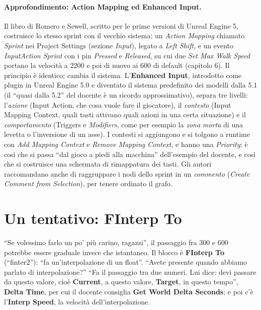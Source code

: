 \paragraph{Approfondimento: Action Mapping ed Enhanced Input.} Il libro di Romero e
Sewell, scritto per le prime versioni di Unreal Engine 5, costruisce lo stesso sprint
con il vecchio sistema: un \emph{Action Mapping} chiamato \emph{Sprint} nei Project
Settings (sezione \emph{Input}), legato a \emph{Left Shift}, e un evento
\emph{InputAction Sprint} con i pin \emph{Pressed} e \emph{Released}, su cui due
\emph{Set Max Walk Speed} portano la velocità a 2200 e poi di nuovo ai 600 di default
(capitolo 6). Il principio è identico; cambia il sistema. L'\textbf{Enhanced Input},
introdotto come plugin in Unreal Engine 5.0 e diventato il sistema predefinito dei
modelli dalla 5.1 (il ``quasi dalla 5.2'' del docente è un ricordo approssimativo), separa
tre livelli: l'\emph{azione} (Input Action, che cosa vuole fare il giocatore), il
\emph{contesto} (Input Mapping Context, quali tasti attivano quali azioni in una certa
situazione) e il \emph{comportamento} (Triggers e \emph{Modifiers}, come per esempio la
\emph{zona morta} di una levetta o l'inversione di un asse). I contesti si aggiungono e
si tolgono a runtime con \emph{Add Mapping Context} e \emph{Remove Mapping Context}, e
hanno una \emph{Priority}: è così che si passa ``dal gioco a piedi alla macchina''
dell'esempio del docente, e così che si costruisce una schermata di rimappatura dei
tasti. Gli autori raccomandano anche di raggruppare i nodi dello sprint in un
\emph{commento} (\emph{Create Comment from Selection}), per tenere ordinato il grafo.

\section{Un tentativo: FInterp To}
\label{ue9:sec:finterp}

``Se volessimo farlo un po' più carino, ragazzi'', il passaggio fra 300 e 600 potrebbe
essere graduale invece che istantaneo. Il blocco è \textbf{FInterp To} (``finter2''):
``fa un'interpolazione di un float''. ``Avete presente quando abbiamo parlato di
interpolazione?'' ``Fa il passaggio tra due numeri. Lui dice: devi passare da questo
valore, cioè \textbf{Current}, a questo valore, \textbf{Target}, in questo tempo'',
\textbf{Delta Time}, per cui il docente consiglia \textbf{Get World Delta Seconds}; e
poi c'è l'\textbf{Interp Speed}, la velocità dell'interpolazione.

